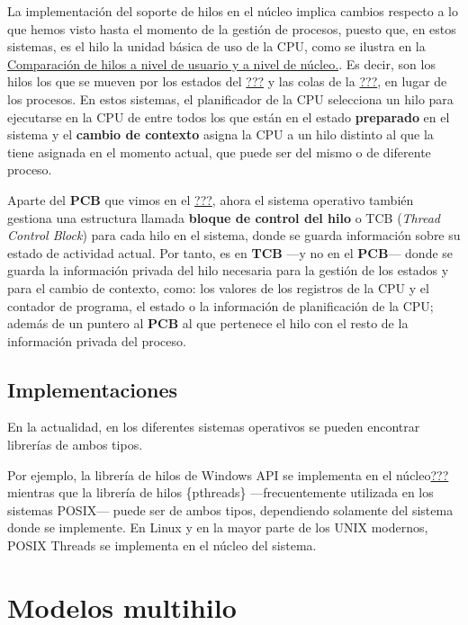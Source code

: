 La implementación del soporte de hilos en el núcleo implica cambios
respecto a lo que hemos visto hasta el momento de la gestión de
procesos, puesto que, en estos sistemas, es el hilo la unidad básica de
uso de la CPU, como se ilustra en la
\hyperref[fig-comparaciuxf3n-soporte-de-hilos]{Comparación de hilos a
nivel de usuario y a nivel de núcleo.}. Es decir, son los hilos los que
se mueven por los estados del
\hyperref[fig-diagrama-estado-proceso]{???} y las colas de la
\hyperref[fig-colas-de-planificaciuxf3n-procesos]{???}, en lugar de los
procesos. En estos sistemas, el planificador de la CPU selecciona un
hilo para ejecutarse en la CPU de entre todos los que están en el estado
\textbf{preparado} en el sistema y el \textbf{cambio de contexto} asigna
la CPU a un hilo distinto al que la tiene asignada en el momento actual,
que puede ser del mismo o de diferente proceso.

Aparte del \textbf{PCB} que vimos en el
\hyperref[_bloque_de_control_de_proceso]{???}, ahora el sistema
operativo también gestiona una estructura llamada \textbf{bloque de
control del hilo}{} o {}TCB (\emph{Thread Control Block}) para cada hilo
en el sistema, donde se guarda información sobre su estado de actividad
actual. Por tanto, es en \textbf{TCB} ---y no en el \textbf{PCB}---
donde se guarda la información privada del hilo necesaria para la
gestión de los estados y para el cambio de contexto, como: los valores
de los registros de la CPU y el contador de programa, el estado o la
información de planificación de la CPU; además de un puntero al
\textbf{PCB} al que pertenece el hilo con el resto de la información
privada del proceso.

\subsection{Implementaciones}\label{_implementaciones}

En la actualidad, en los diferentes sistemas operativos se pueden
encontrar librerías de ambos tipos.

Por ejemplo, la librería de hilos de Windows API se implementa en el
núcleo\hyperref[Win32-UsingProcessesAndThreads]{???} mientras que la
librería de hilos \{pthreads\} ---frecuentemente utilizada en los
sistemas POSIX--- puede ser de ambos tipos, dependiendo solamente del
sistema donde se implemente. En Linux y en la mayor parte de los UNIX
modernos, POSIX Threads se implementa en el núcleo del sistema.

\section{Modelos multihilo}\label{_modelos_multihilo}

